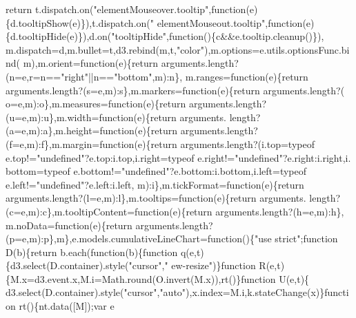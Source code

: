 \begin{DoxyCode}
{      return} t.dispatch.on(\textcolor{stringliteral}{"elementMouseover.tooltip"},\textcolor{keyword}{function}(e)\{d.tooltipShow(e)\}),t.dispatch.on(\textcolor{stringliteral}{"
      elementMouseout.tooltip"},\textcolor{keyword}{function}(e)\{d.tooltipHide(e)\}),d.on(\textcolor{stringliteral}{"tooltipHide"},\textcolor{keyword}{function}()\{c&&e.tooltip.cleanup()\}),
      m.dispatch=d,m.bullet=t,d3.rebind(m,t,\textcolor{stringliteral}{"color"}),m.options=e.utils.optionsFunc.bind(
      m),m.orient=\textcolor{keyword}{function}(e)\{\textcolor{keywordflow}{return} arguments.length?(n=e,r=n==\textcolor{stringliteral}{"right"}||n==\textcolor{stringliteral}{"bottom"},m):n\},
      m.ranges=\textcolor{keyword}{function}(e)\{\textcolor{keywordflow}{return} arguments.length?(s=e,m):s\},m.markers=\textcolor{keyword}{function}(e)\{\textcolor{keywordflow}{return} arguments.length?(
      o=e,m):o\},m.measures=\textcolor{keyword}{function}(e)\{\textcolor{keywordflow}{return} arguments.length?(u=e,m):u\},m.width=\textcolor{keyword}{function}(e)\{\textcolor{keywordflow}{return} arguments.
      length?(a=e,m):a\},m.height=\textcolor{keyword}{function}(e)\{\textcolor{keywordflow}{return} arguments.length?(f=e,m):f\},m.margin=\textcolor{keyword}{function}(e)\{\textcolor{keywordflow}{return} 
      arguments.length?(i.top=typeof e.top!=\textcolor{stringliteral}{"undefined"}?e.top:i.top,i.right=typeof e.right!=\textcolor{stringliteral}{"undefined"}?e.right:i.right,i.
      bottom=typeof e.bottom!=\textcolor{stringliteral}{"undefined"}?e.bottom:i.bottom,i.left=typeof e.left!=\textcolor{stringliteral}{"undefined"}?e.left:i.left,
      m):i\},m.tickFormat=\textcolor{keyword}{function}(e)\{\textcolor{keywordflow}{return} arguments.length?(l=e,m):l\},m.tooltips=\textcolor{keyword}{function}(e)\{\textcolor{keywordflow}{return} arguments.
      length?(c=e,m):c\},m.tooltipContent=\textcolor{keyword}{function}(e)\{\textcolor{keywordflow}{return} arguments.length?(h=e,m):h\},
      m.noData=\textcolor{keyword}{function}(e)\{\textcolor{keywordflow}{return} arguments.length?(p=e,m):p\},m\},e.models.cumulativeLineChart=\textcolor{keyword}{function}()\{\textcolor{stringliteral}{"use
       strict"};\textcolor{keyword}{function} D(b)\{\textcolor{keywordflow}{return} b.each(\textcolor{keyword}{function}(b)\{\textcolor{keyword}{function} q(e,t)\{d3.select(D.container).style(\textcolor{stringliteral}{"cursor"},\textcolor{stringliteral}{"
      ew-resize"})\}\textcolor{keyword}{function} R(e,t)\{M.x=d3.event.x,M.i=Math.round(O.invert(M.x)),rt()\}\textcolor{keyword}{function} U(e,t)\{
      d3.select(D.container).style(\textcolor{stringliteral}{"cursor"},\textcolor{stringliteral}{"auto"}),x.index=M.i,k.stateChange(x)\}\textcolor{keyword}{function} rt()\{nt.data([M]);var e

\end{DoxyCode}
